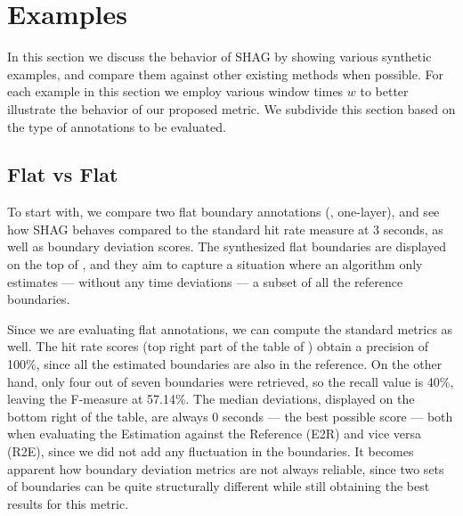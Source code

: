 \documentclass{article}
\begin{document}
\section{Examples}\label{sec:examples}

In this section we discuss the behavior of SHAG by showing various synthetic examples, and compare them against other existing methods when possible.
For each example in this section we employ various window times $w$ to better illustrate the behavior of our proposed metric.
We subdivide this section based on the type of annotations to be evaluated.

\subsection{Flat vs Flat}

To start with, we compare two flat boundary annotations (\ie, one-layer), and see how SHAG behaves compared to the standard hit rate measure at 3 seconds, as well as boundary deviation
scores.
The synthesized flat boundaries are displayed on the top of , and they aim to capture a situation where an algorithm only estimates --- without any time deviations
--- a subset of all the reference boundaries.


Since we are evaluating flat annotations, we can compute the standard metrics as well. The hit rate scores (top right part of the table of ) obtain a precision of 100\%, since all the estimated boundaries are also in the reference.
On the other hand, only four out of seven boundaries were retrieved, so the recall value is 40\%, leaving the F-measure at 57.14\%.
The median deviations, displayed on the bottom right of the table, are always 0 seconds --- the best possible score --- both when evaluating the Estimation against the Reference (E2R) and vice versa (R2E), since we did not add any fluctuation in the boundaries.
It becomes apparent how boundary deviation metrics are not always reliable, since two sets of boundaries can be quite structurally different while still obtaining the best results for this metric.
\end{document}

